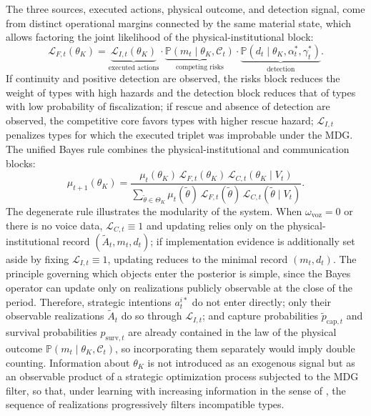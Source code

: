 \documentclass[review,authoryear,12pt]{elsarticle}
\theoremstyle{plain}
\theoremstyle{definition}
\newcommand{\Prob}{\mathbb{P}}
\newcommand{\ThetaK}{\Theta_K}
\newcommand{\1}{\mathbf{1}}
\begin{document}
The three sources, executed actions, physical outcome, and detection signal, come from distinct operational margins connected by the same material state, which allows factoring the joint likelihood of the physical-institutional block:
\begin{equation}
\mathcal{L}_{F,t}(\theta_K)=\underbrace{\mathcal{L}_{I,t}(\theta_K)}_{\text{executed actions}}\cdot\underbrace{\Prob(m_t\mid\theta_K,\mathcal{C}_t)}_{\text{competing risks}}\cdot\underbrace{\Prob(d_t\mid\theta_K,\alpha_t^\ast,\gamma_t^\ast)}_{\text{detection}}.
\label{eq:LF-joint}
\end{equation}
If continuity and positive detection are observed, the risks block reduces the weight of types with high hazards and the detection block reduces that of types with low probability of fiscalization; if rescue and absence of detection are observed, the competitive core favors types with higher rescue hazard; $\mathcal{L}_{I,t}$ penalizes types for which the executed triplet was improbable under the MDG. The unified Bayes rule combines the physical-institutional and communication blocks:
\begin{equation}
\mu_{t+1}(\theta_K)=\frac{\mu_t(\theta_K)\,\mathcal{L}_{F,t}(\theta_K)\,\mathcal{L}_{C,t}(\theta_K\mid V_t)}{\sum_{\tilde\theta\in\ThetaK}\mu_t(\tilde\theta)\,\mathcal{L}_{F,t}(\tilde\theta)\,\mathcal{L}_{C,t}(\tilde\theta\mid V_t)}.
\label{eq:bayes-update}
\end{equation}
The degenerate rule illustrates the modularity of the system. When $\omega_{\mathrm{voz}}=0$ or there is no voice data, $\mathcal{L}_{C,t}\equiv 1$ and updating relies only on the physical-institutional record $(\tilde{A}_t,m_t,d_t)$; if implementation evidence is additionally set aside by fixing $\mathcal{L}_{I,t}\equiv 1$, updating reduces to the minimal record $(m_t,d_t)$. The principle governing which objects enter the posterior is simple, since the Bayes operator can update only on realizations publicly observable at the close of the period. Therefore, strategic intentions $a_t^{i\ast}$ do not enter directly; only their observable realizations $\tilde{A}_t$ do so through $\mathcal{L}_{I,t}$; and capture probabilities $\tilde{p}_{\mathrm{cap},t}$ and survival probabilities $p_{\mathrm{surv},t}$ are already contained in the law of the physical outcome $\Prob(m_t\mid\theta_K,\mathcal{C}_t)$, so incorporating them separately would imply double counting. Information about $\theta_K$ is not introduced as an exogenous signal but as an observable product of a strategic optimization process subjected to the MDG filter, so that, under learning with increasing information in the sense of \citet{BlackwellDubins1962}, the sequence of realizations progressively filters incompatible types.
\end{document}
